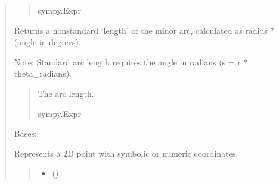 \documentclass[letterpaper,10pt,english]{sphinxmanual}
\begin{document}
\begin{quote}
\begin{fulllineitems}
\begin{fulllineitems}
\begin{quote}
\begin{description}
\sphinxAtStartPar
sympy.Expr

\end{description}\end{quote}

\end{fulllineitems}


\begin{fulllineitems}
\label{\detokenize{pygeox:pygeox.basic_objects.MinorArc.length}}
\pysigstartsignatures
\pysigline
{}
\pysigstopsignatures
\sphinxAtStartPar
Returns a non\sphinxhyphen{}standard ‘length’ of the minor arc, calculated as radius * (angle in degrees).

\sphinxAtStartPar
Note: Standard arc length requires the angle in radians (s = r * theta\_radians).
\begin{quote}\begin{description}
\sphinxAtStartPar
The arc length.

\sphinxAtStartPar
sympy.Expr

\end{description}\end{quote}

\end{fulllineitems}


\end{fulllineitems}


\begin{fulllineitems}
\label{\detokenize{pygeox:pygeox.basic_objects.Point}}
\pysigstartsignatures
\pysiglinewithargsret
{}
{\sphinxparamcomma {}\sphinxparamcomma {}}
{}
\pysigstopsignatures
\sphinxAtStartPar
Bases: 

\sphinxAtStartPar
Represents a 2D point with symbolic or numeric coordinates.
\begin{quote}\begin{description}
\begin{itemize}
\item {} 
\sphinxAtStartPar
{} ()


\end{itemize}
\end{description}
\end{quote}
\end{fulllineitems}
\end{quote}
\end{document}
